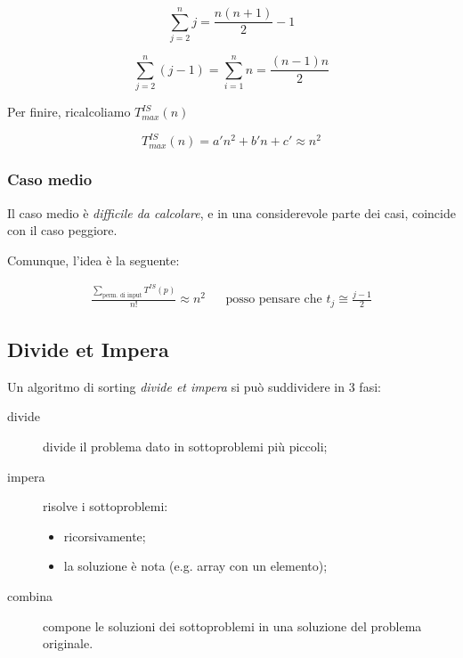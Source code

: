 \begin{displaymath}
    \displaystyle\sum_{j=2}^{n}j = \frac{n(n+1)}{2}-1
\end{displaymath}

\begin{displaymath}
    \displaystyle\sum_{j=2}^{n}(j-1) = \displaystyle\sum_{i=1}^{n}n = \frac{(n-1)n}{2}
\end{displaymath}

Per finire, ricalcoliamo $T^{IS}_{max}(n)$

\begin{displaymath}
    T^{IS}_{max}(n) = a'n^2+b'n+c' \approx n^2
\end{displaymath}

\subsubsection{Caso medio} \label{is:casomedio}
Il caso medio è \emph{difficile da calcolare}, e in una considerevole parte dei casi,
coincide con il caso peggiore.\par
Comunque, l'idea è la seguente:

\begin{align*}
    \frac{\displaystyle\sum_{\text{perm. di input}}T^{IS}(p)}{n!} \approx n^2 && 
        \text{posso pensare che } t_j \cong \frac{j-1}{2}
\end{align*}

\subsection{Divide et Impera}

Un algoritmo di sorting \emph{divide et impera} si può suddividere in 3 fasi:

\begin{description}
    \item[divide] divide il problema dato in sottoproblemi più piccoli;
    \item[impera] risolve i sottoproblemi:
    \begin{itemize}
        \item ricorsivamente;
        \item la soluzione è nota (e.g. array con un elemento);
    \end{itemize}
    \item[combina] compone le soluzioni dei sottoproblemi in una soluzione del 
        problema originale.
\end{description}

